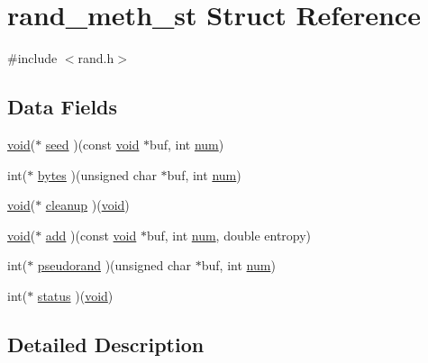 \hypertarget{structrand__meth__st}{}\section{rand\+\_\+meth\+\_\+st Struct Reference}
\label{structrand__meth__st}


{\ttfamily \#include $<$rand.\+h$>$}

\subsection*{Data Fields}
\begin{DoxyCompactItemize}
\item 
\hyperlink{hw__4758__cca_8h_afad4d591c7931ff6dc5bf69c76c96aa0}{void}($\ast$ \hyperlink{structrand__meth__st_a8bb5aef25587a1d79943612b7d609df7}{seed} )(const \hyperlink{hw__4758__cca_8h_afad4d591c7931ff6dc5bf69c76c96aa0}{void} $\ast$buf, int \hyperlink{ssl__locl_8h_acc57d6ccf009b225ff81bbd136682d08}{num})
\item 
int($\ast$ \hyperlink{structrand__meth__st_ae936ddc5556cb5c59453d62ab054172e}{bytes} )(unsigned char $\ast$buf, int \hyperlink{ssl__locl_8h_acc57d6ccf009b225ff81bbd136682d08}{num})
\item 
\hyperlink{hw__4758__cca_8h_afad4d591c7931ff6dc5bf69c76c96aa0}{void}($\ast$ \hyperlink{structrand__meth__st_a8e1ba7348775abcd3cd56ec6f718bea0}{cleanup} )(\hyperlink{hw__4758__cca_8h_afad4d591c7931ff6dc5bf69c76c96aa0}{void})
\item 
\hyperlink{hw__4758__cca_8h_afad4d591c7931ff6dc5bf69c76c96aa0}{void}($\ast$ \hyperlink{structrand__meth__st_a9c2e95483d7f1f77ac21ff74a2a28f17}{add} )(const \hyperlink{hw__4758__cca_8h_afad4d591c7931ff6dc5bf69c76c96aa0}{void} $\ast$buf, int \hyperlink{ssl__locl_8h_acc57d6ccf009b225ff81bbd136682d08}{num}, double entropy)
\item 
int($\ast$ \hyperlink{structrand__meth__st_aaa7c4023b248bead3632bc75102936ff}{pseudorand} )(unsigned char $\ast$buf, int \hyperlink{ssl__locl_8h_acc57d6ccf009b225ff81bbd136682d08}{num})
\item 
int($\ast$ \hyperlink{structrand__meth__st_a3c125700a2559e38ea6da1590009bea2}{status} )(\hyperlink{hw__4758__cca_8h_afad4d591c7931ff6dc5bf69c76c96aa0}{void})
\end{DoxyCompactItemize}


\subsection{Detailed Description}


